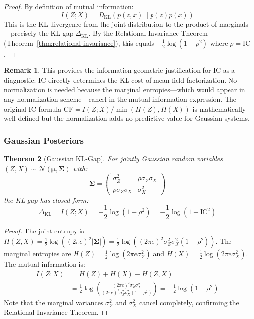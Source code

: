 \documentclass[10pt]{article} %
\theoremstyle{plain}
\newtheorem{theorem}{Theorem}[section]
\theoremstyle{definition}
\newtheorem{remark}[theorem]{Remark}
\newcommand{\IC}{\mathrm{IC}}  %
\begin{document}
\begin{proof}
By definition of mutual information:
\begin{equation}
I(Z; X) = D_{\text{KL}}(p(z,x) \| p(z)p(x))
\end{equation}
This is the KL divergence from the joint distribution to the product of marginals---precisely the KL gap $\Delta_{\text{KL}}$. By the Relational Invariance Theorem (Theorem~\ref{thm:relational-invariance}), this equals $-\frac{1}{2}\log(1-\rho^2)$ where $\rho = \IC$.
\end{proof}

\begin{remark}
This provides the information-geometric justification for IC as a diagnostic: IC directly determines the KL cost of mean-field factorization. No normalization is needed because the marginal entropies---which would appear in any normalization scheme---cancel in the mutual information expression. The original IC formula $\text{CF} = I(Z;X)/\min(H(Z),H(X))$ is mathematically well-defined but the normalization adds no predictive value for Gaussian systems.
\end{remark}

\subsubsection{Gaussian Posteriors}

\begin{theorem}[Gaussian KL-Gap]
\label{thm:gaussian-kl}
For jointly Gaussian random variables $(Z, X) \sim \mathcal{N}(\boldsymbol{\mu}, \boldsymbol{\Sigma})$ with:
\begin{equation}
\boldsymbol{\Sigma} = \begin{pmatrix} \sigma_Z^2 & \rho \sigma_Z \sigma_X \\ \rho \sigma_Z \sigma_X & \sigma_X^2 \end{pmatrix}
\end{equation}
the KL gap has closed form:
\begin{equation}
\Delta_{\text{KL}} = I(Z; X) = -\frac{1}{2}\log(1 - \rho^2) = -\frac{1}{2}\log(1 - \IC^2)
\end{equation}
\end{theorem}

\begin{proof}
The joint entropy is $H(Z, X) = \frac{1}{2}\log\left((2\pi e)^2 |\boldsymbol{\Sigma}|\right) = \frac{1}{2}\log\left((2\pi e)^2 \sigma_Z^2 \sigma_X^2 (1 - \rho^2)\right)$. The marginal entropies are $H(Z) = \frac{1}{2}\log(2\pi e \sigma_Z^2)$ and $H(X) = \frac{1}{2}\log(2\pi e \sigma_X^2)$. The mutual information is:
\begin{align}
I(Z; X) &= H(Z) + H(X) - H(Z, X) \\
&= \frac{1}{2}\log\left(\frac{(2\pi e)^2 \sigma_Z^2 \sigma_X^2}{(2\pi e)^2 \sigma_Z^2 \sigma_X^2 (1 - \rho^2)}\right) = -\frac{1}{2}\log(1 - \rho^2)
\end{align}
Note that the marginal variances $\sigma_Z^2$ and $\sigma_X^2$ cancel completely, confirming the Relational Invariance Theorem.
\end{proof}
\end{document}
